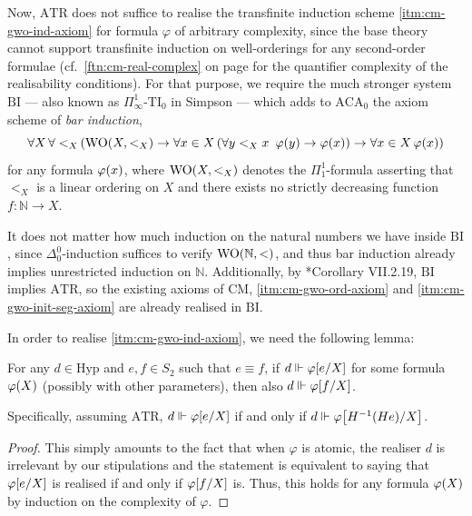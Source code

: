 \documentclass[12pt,openany]{book}
\makeatletter
\newcommand\inda[1]{\index{B@Arithmetic!#1}}
\theoremstyle{plain}
\theoremstyle{definition}
\newcommand\opA[1]{\mathop{\forall #1}}
\DeclareMathOperator\WO{WO}
\newcommand\ACA{\mathrm{ACA}}
\newcommand\ATR{\mathrm{ATR}}
\newcommand\BI{\mathrm{BI}}
\newcommand\AC{\text{-}\mathrm{AC}}
\newcommand\TI{\text{-}\mathrm{TI}}
\newcommand\CM{\mathrm{CM}}
\newcommand\Hyp{\mathrm{Hyp}}
\makeatother
\begin{document}
Now, $\ATR$ does not suffice to realise the transfinite induction scheme \ref{itm:cm-gwo-ind-axiom} for formula $\varphi$ of arbitrary complexity, since the base theory cannot support transfinite induction on well-orderings for any second-order formulae (cf.\ \autoref{ftn:cm-real-complex} on page \pageref{ftn:cm-real-complex} for the quantifier complexity of the realisability conditions). For that purpose, we require the much stronger system $\BI$\inda{bar induction, $\BI$} --- also known as $\Pi^1_\infty\TI_0$ in Simpson \cite{simpson09-soa} --- which adds to $\ACA_0$ the axiom scheme of \emph{bar induction},
\[\opA{X} \opA{<_X} \left(\WO\mleft(X, {<_X}\mright) \rightarrow \opA{x \in X} \left(\opA{y <_X x} \ \varphi\mleft(y\mright) \rightarrow \varphi\mleft(x\mright)\right) \rightarrow \opA{x \in X} \varphi\mleft(x\mright)\right)\]
for any formula $\varphi\mleft(x\mright)$, where $\WO\mleft(X, {<_X}\mright)$ denotes the $\Pi^1_1$-formula asserting that $<_X$ is a linear ordering on $X$ and there exists no strictly decreasing function $f : \mathbb{N} \rightarrow X$.

It does not matter how much induction on the natural numbers we have inside $\BI$, since $\Delta^0_0$-induction suffices to verify $\WO\mleft(\mathbb{N}, <\mright)$, and thus bar induction already implies unrestricted induction on $\mathbb{N}$. Additionally, by \cite{simpson09-soa}*{Corollary VII.2.19}, $\BI$ implies $\ATR$, so the existing axioms of $\CM$, \ref{itm:cm-gwo-ord-axiom} and \ref{itm:cm-gwo-init-seg-axiom} are already realised in $\BI$.

In order to realise \ref{itm:cm-gwo-ind-axiom}, we need the following lemma:
\begin{lemma}[$\Sigma^1_1\AC$]
  \label{lem:cm-same-real-equiv-form}
  For any $d \in \Hyp$ and $e, f \in S_2$ such that $e \equiv f$, if $d \Vdash \varphi\mleft[e/X\mright]$ for some formula $\varphi\mleft(X\mright)$ (possibly with other parameters), then also $d \Vdash \varphi\mleft[f/X\mright]$.

  Specifically, assuming $\ATR$, $d \Vdash \varphi\mleft[e/X\mright]$ if and only if $d \Vdash \varphi\mleft[H^{-1} \mleft(He\mright)/X\mright]$.
\end{lemma}

\begin{proof}
  This simply amounts to the fact that when $\varphi$ is atomic, the realiser $d$ is irrelevant by our stipulations and the statement is equivalent to saying that $\varphi\mleft[e/X\mright]$ is realised if and only if $\varphi\mleft[f/X\mright]$ is. Thus, this holds for any formula $\varphi\mleft(X\mright)$ by induction on the complexity of $\varphi$.
\end{proof}
\end{document}
